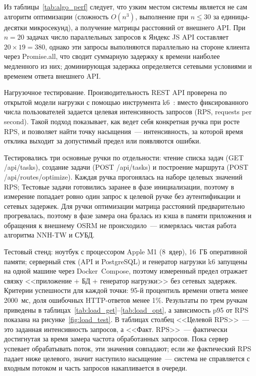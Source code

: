 Из таблицы~\ref{tab:algo_perf} следует, что узким местом системы является
не сам алгоритм оптимизации (сложность $O(n^3)$, выполнение при $n \leq 30$
за единицы-десятки микросекунд),
а получение матрицы расстояний от внешнего API.
При $n = 20$ задачах число параллельных запросов к Яндекс JS API составляет
$20 \times 19 = 380$, однако эти запросы выполняются параллельно на стороне клиента
через Promise.all, что сводит суммарную задержку к времени
наиболее медленного из них; доминирующая задержка определяется
сетевыми условиями и временем ответа внешнего API.

Нагрузочное тестирование. Производительность REST API проверена по открытой
модели нагрузки с помощью инструмента k6~\cite{k6}: вместо фиксированного числа
пользователей задается целевая интенсивность запросов (RPS, requests per
second). Такой подход показывает, как ведет себя конкретная ручка при росте RPS, и позволяет найти
точку насыщения~--- интенсивность, за которой время отклика выходит за
допустимый предел или появляются ошибки.

Тестировались три основные ручки по отдельности: чтение списка задач
(GET /api/tasks), создание задачи (POST /api/tasks) и построение маршрута
(POST /api/routes/optimize). Каждая ручка прогонялась на наборе целевых
значений RPS; Тестовые задачи готовились заранее в фазе инициализации, поэтому в измерение попадает ровно один запрос к целевой
ручке без аутентификации и сетевых задержек. Для ручки оптимизации матрица расстояний предварительно
прогревалась, поэтому в фазе замера она бралась из кэша в памяти приложения и
обращения к внешнему OSRM не происходило~--- измерялась чистая работа алгоритма
NNH-TW и СУБД.

Тестовый стенд: ноутбук с процессором Apple M1 (8~ядер), 16~ГБ оперативной
памяти; серверный стек (API и PostgreSQL) и генератор нагрузки k6 запущены на
одной машине через Docker~Compose, поэтому измеренный предел отражает связку
<<приложение + БД + генератор нагрузки>> без сетевых задержек. Критерии
успешности для каждой точки: 95-й процентиль времени ответа менее 2000~мс, доля
ошибочных HTTP-ответов менее 1\%. Результаты по трем ручкам приведены в
таблицах~\ref{tab:load_get}--\ref{tab:load_opt}, а зависимость p95 от RPS
показана на рисунке~\ref{fig:load_test}. В таблицах столбец <<Целевой RPS>>~---
это заданная интенсивность запросов, а <<Факт. RPS>>~--- фактически достигнутая
за время замера частота обработанных запросов. Пока сервер успевает обрабатывать
поток, эти значения совпадают; если же фактический RPS падает ниже целевого,
значит наступило насыщение~--- система не справляется с входным потоком и часть
запросов накапливается в очереди.

